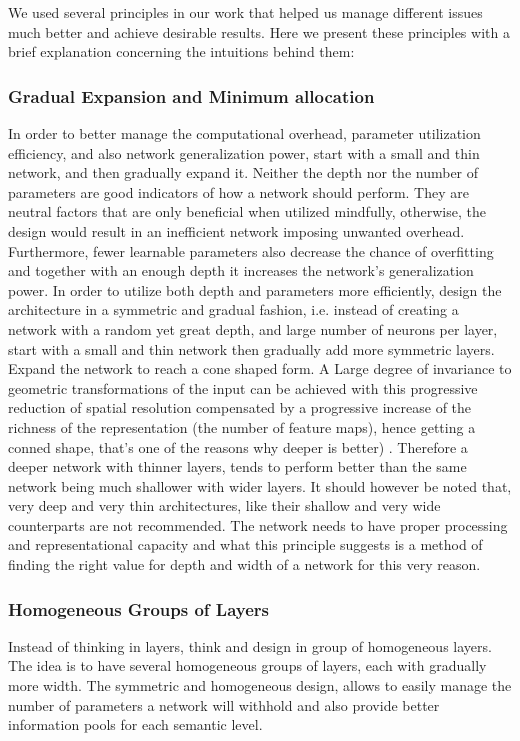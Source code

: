 \documentclass{article} \usepackage{lets_keepit_simple,times}
\begin{document}
We used several principles in our work that helped us manage different issues much better and achieve desirable results. Here we present these principles with a brief explanation concerning the intuitions behind them: 

\subsubsection{Gradual Expansion and Minimum allocation}
In order to better manage the computational overhead, parameter utilization efficiency, and also network generalization power, start with a small and thin network, and then gradually expand it. Neither the depth nor the number of parameters are good indicators of how a network should perform. They are neutral factors that are only beneficial when utilized mindfully, otherwise, the design would result in an inefficient network imposing unwanted overhead. Furthermore, fewer learnable parameters also decrease the chance of overfitting and together with an enough depth it increases the network's generalization power. In order to utilize both depth and parameters more efficiently, design the architecture in a symmetric and gradual fashion, i.e. instead of creating a network with a random yet great depth, and large number of neurons per layer, start with a small and thin network then gradually add more symmetric layers. Expand the network to reach a cone shaped form. A Large degree of invariance to geometric transformations of the input can be achieved with this progressive reduction of spatial resolution compensated by a progressive increase of the richness of the representation (the number of feature maps), hence getting a conned shape, that's one of the reasons why deeper is better) \cite{Lecun_GradientBased_CNN_1998}. Therefore a deeper network with thinner layers, tends to perform better than the same network being much shallower with wider layers. It should however be noted that, very deep and very thin architectures, like their shallow and very wide counterparts are not recommended. The network needs to have proper processing and representational capacity and what this principle suggests is a method of finding the right value for depth and width of a network for this very reason. 

\subsubsection{Homogeneous Groups of Layers}
Instead of thinking in layers, think and design in group of homogeneous layers. The idea is to have several homogeneous groups of layers, each with gradually more width. The symmetric and homogeneous design, allows to easily manage the number of parameters a network will withhold and also provide better information pools for each semantic level.  
\end{document}
